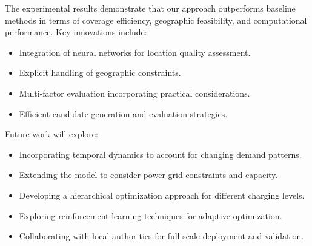 \documentclass[journal]{IEEEtran}
\begin{document}
The experimental results demonstrate that our approach outperforms baseline methods in terms of coverage efficiency, geographic feasibility, and computational performance. Key innovations include:
\begin{itemize}
    \item Integration of neural networks for location quality assessment.
    \item Explicit handling of geographic constraints.
    \item Multi-factor evaluation incorporating practical considerations.
    \item Efficient candidate generation and evaluation strategies.
\end{itemize}

Future work will explore:
\begin{itemize}
    \item Incorporating temporal dynamics to account for changing demand patterns.
    \item Extending the model to consider power grid constraints and capacity.
    \item Developing a hierarchical optimization approach for different charging levels.
    \item Exploring reinforcement learning techniques for adaptive optimization.
    \item Collaborating with local authorities for full-scale deployment and validation.
\end{itemize}
\end{document}
